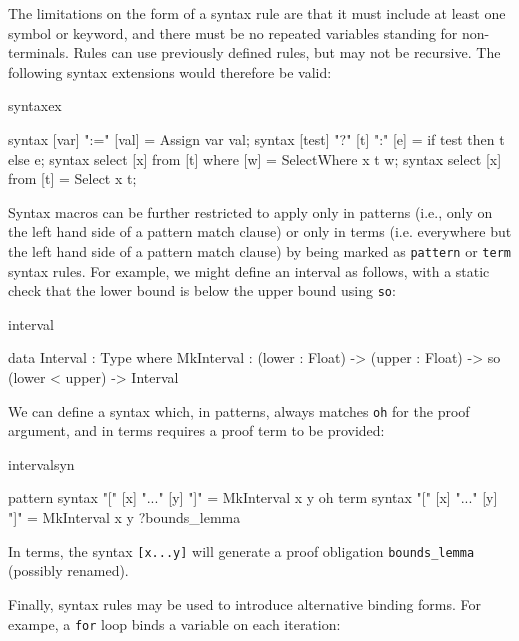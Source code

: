 \noindent
The limitations on the form of a syntax rule are that it must include at least one
symbol or keyword, and there must be no repeated variables standing for non-terminals.
Rules can use previously defined rules, but may not be recursive.
The following syntax extensions would therefore be valid:

\begin{SaveVerbatim}{syntaxex}

syntax [var] ":=" [val]              = Assign var val;
syntax [test] "?" [t] ":" [e]        = if test then t else e;
syntax select [x] from [t] where [w] = SelectWhere x t w;
syntax select [x] from [t]           = Select x t;

\end{SaveVerbatim}

\noindent
Syntax macros can be further restricted to apply only in patterns (i.e., only on the left
hand side of a pattern match clause) or only in terms (i.e. everywhere but the left hand side
of a pattern match clause) by being marked as \texttt{pattern} or \texttt{term} syntax
rules. For example, we might define an interval as follows, with a static check
that the lower bound is below the upper bound using \texttt{so}:

\begin{SaveVerbatim}{interval}

data Interval : Type where
   MkInterval : (lower : Float) -> (upper : Float) -> 
                so (lower < upper) -> Interval

\end{SaveVerbatim}

\noindent
We can define a syntax which, in patterns, always matches \texttt{oh} for the proof 
argument, and in terms requires a proof term to be provided:

\begin{SaveVerbatim}{intervalsyn}

pattern syntax "[" [x] "..." [y] "]" = MkInterval x y oh
term    syntax "[" [x] "..." [y] "]" = MkInterval x y ?bounds_lemma

\end{SaveVerbatim}

\noindent
In terms, the syntax \texttt{[x...y]} will generate a proof obligation
\texttt{bounds\_lemma} (possibly renamed).

Finally, syntax rules may be used to introduce alternative binding forms. For
exampe, a \texttt{for} loop binds a variable on each iteration:

